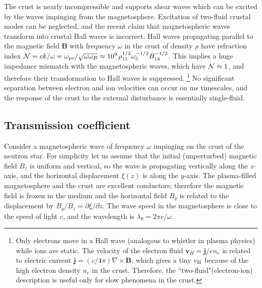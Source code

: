 The crust is nearly incompressible and supports shear waves which can be excited by the \alfven waves impinging from the magnetosphere. 
Excitation of two-fluid crustal modes can be neglected, and the recent claim that magnetospheric \alfven waves  transform into crustal Hall waves \citep{2015MNRAS.447.1407L} is incorrect.
Hall waves propagating parallel to the magnetic field ${\mathbf B}$ with frequency $\omega$ in the crust of density $\rho$ have refraction index 
${\cal N}=ck/\omega=\omega_{\mathrm{pe}}/\sqrt{\omega\omega_B}
\approx 10^{9}\, \rho_{11}^{1/2} \omega_5^{-1/2} B_{14}^{-1/2}$. 
This implies a huge impedance mismatch with the magnetospheric \alfven waves, which have ${\cal N}\approx 1$, and therefore their transformation to Hall waves is suppressed.
\footnote{Only electrons move in a Hall wave (analogous to whistler in plasma physics) while ions are static.
The velocity of the electron fluid $\mathbf{v}_H=\mathbf{j}/en_e$ is related to electric current $\mathbf{j}=(c/4\pi)\nabla\times {\mathbf B}$, which gives a tiny $v_{\rm H}$ because of the high electron density $n_e$ in the crust. 
Therefore, the ``two-fluid"(electron-ion) description is useful only for slow phenomena in the crust.}
No significant separation between electron and ion velocities can occur on ms timescales, and the response of the crust to the external disturbance is essentially single-fluid.
     
\subsection{Transmission coefficient}

Consider a magnetospheric \alfven wave of frequency $\omega$ impinging on the crust of the neutron star. For simplicity let us assume that the initial (unperturbed) magnetic field $B_z$ is uniform and vertical, so the wave is propagating vertically along the $z$-axis, and the horizontal displacement $\xi(z)$ is along the $y$-axis. 
The plasma-filled magnetosphere and the crust are excellent conductors; therefore the magnetic field is frozen in the medium and the horizontal field $B_y$ is related to the displacement by $B_y/B_z=\partial\xi/\partial z$.
The wave speed in the magnetosphere is close to the speed of light $c$, and the wavelength is $\lambda_0=2\pi c/\omega$. 

